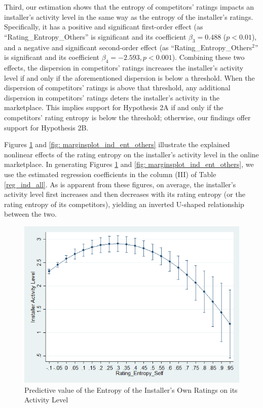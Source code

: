 \documentclass[msom,blindrev]{informs3}
\begin{document}
Third,  our estimation shows that the entropy of competitors' ratings impacts an installer's activity level in the same way as the entropy of the installer's ratings. Specifically, it has a positive and significant first-order effect (as ``Rating\_Entropy\_Others'' is significant and its coefficient $\beta_{3} =  0.488$ ($p<0.01$), and a negative and significant second-order effect (as ``Rating\_Entropy\_Others$^{2}$'' is significant and its coefficient $\beta_{4} = -2.593, p<0.001$). Combining these two effects,
 the dispersion in competitors' ratings increases the installer's activity level if and only if the aforementioned dispersion is below a threshold. When the dispersion of competitors' ratings is above that threshold, any additional dispersion in competitors' ratings deters the installer's activity in the marketplace. This implies support for Hypothesis 2A if and only if the competitors' rating entropy is below the threshold; otherwise, our findings offer support for Hypothesis 2B.


Figures \ref{fig: marginsplot_ind_ent_self} and  \ref{fig: marginsplot_ind_ent_others} illustrate the explained nonlinear effects of the rating entropy on the installer's activity level in the online marketplace. In generating Figures \ref{fig: marginsplot_ind_ent_self} and  \ref{fig: marginsplot_ind_ent_others}, we use the estimated regression coefficients in the column (III) of Table \ref{reg_ind_all}. As is apparent from these figures, on average, the installer's activity level first increases and then decreases with its rating entropy (or the rating entropy of its competitors), yielding an inverted U-shaped relationship between the two.

\begin{figure}
	\centering
	\includegraphics[width=0.7\linewidth]{marginsplot_entself.png}
	\caption{Predictive value of the Entropy of the Installer's Own Ratings on its Activity Level}
	\label{fig: marginsplot_ind_ent_self}
\end{figure}
\end{document}
